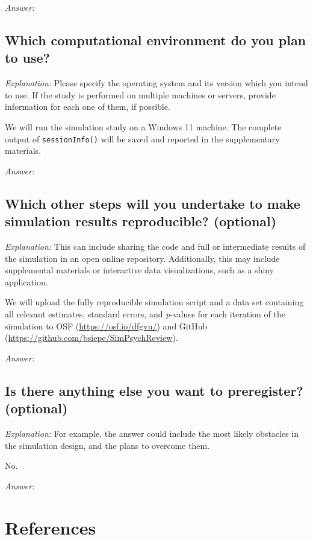 \documentclass[12pt]{article}
\begin{document}
\textit{Answer:}

\subsection{Which computational environment do you plan to use?}

\textit{Explanation:} Please specify the operating system and its version which you intend to use. If the study is performed on multiple machines or servers, provide information for each one of them, if possible.

\begin{examplebox}
We will run the simulation study on a Windows 11 machine. The complete output of \texttt{sessionInfo()} will be saved and reported in the supplementary materials.
\end{examplebox}

\textit{Answer:}

\subsection{Which other steps will you undertake to make simulation results reproducible? \textmd{(optional)}}

\textit{Explanation:} This can include sharing the code and full or intermediate results of the simulation in an open online repository. Additionally, this may include supplemental materials or interactive data visualizations, such as a shiny application.

\begin{examplebox}
We will upload the fully reproducible simulation script and a data set containing all relevant estimates, standard errors, and \textit{p}-values for each iteration of the simulation to OSF (\url{https://osf.io/dfgvu/}) and GitHub (\url{https://github.com/bsiepe/SimPsychReview}).
\end{examplebox}

\textit{Answer:}

\subsection{Is there anything else you want to preregister? \textmd{(optional)}}

\textit{Explanation:} For example, the answer could include the most likely obstacles in the simulation design, and the plans to overcome them.

\begin{examplebox}
No.
\end{examplebox}

\textit{Answer:}

\newpage
\section*{References}
\printbibliography[heading=none]
\end{document}
